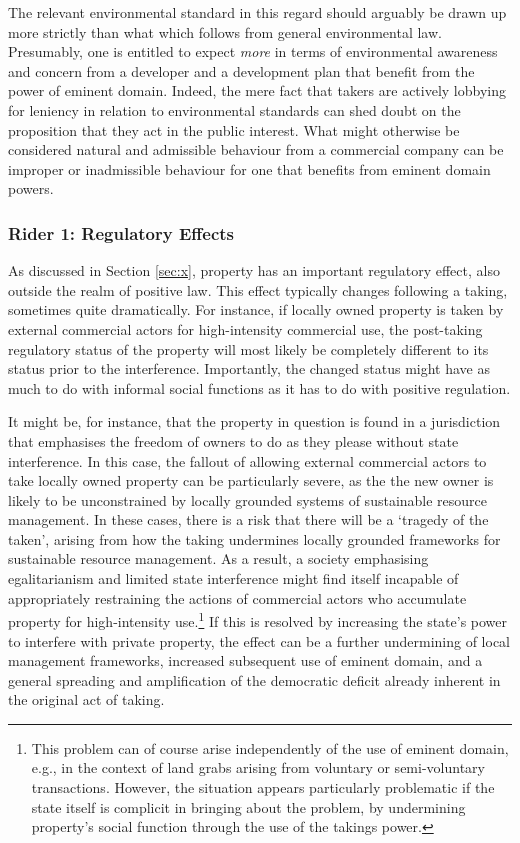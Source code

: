 The relevant environmental standard in this regard should arguably be drawn up more strictly than what which follows from general environmental law. Presumably, one is entitled to expect {\it more} in terms of environmental awareness and concern from a developer and a development plan that benefit from the power of eminent domain. Indeed, the mere fact that takers are actively lobbying for leniency in relation to environmental standards can shed doubt on the proposition that they act in the public interest. What might otherwise be considered natural and admissible behaviour from a commercial company can be improper or inadmissible behaviour for one that benefits from eminent domain powers.

\subsubsection*{Rider 1: Regulatory Effects}

As discussed in Section \ref{sec:x}, property has an important regulatory effect, also outside the realm of positive law. This effect typically changes following a taking, sometimes quite dramatically.  For instance, if locally owned property is taken by external commercial actors for high-intensity commercial use, the post-taking regulatory status of the property will most likely be completely different to its status prior to the interference. Importantly, the changed status might have as much to do with informal social functions as it has to do with positive regulation.

It might be, for instance, that the property in question is found in a jurisdiction that emphasises  the freedom of owners to do as they please without state interference. In this case, the fallout of allowing external commercial actors to take locally owned property can be particularly severe, as the the new owner is likely to be unconstrained by locally grounded systems of sustainable resource management. In these cases, there is a risk that there will be a `tragedy of the taken', arising from how the taking undermines locally grounded frameworks for sustainable resource management. As a result, a society emphasising egalitarianism and limited state interference might find itself incapable of appropriately restraining the actions of commercial actors who accumulate property for high-intensity use.\footnote{This problem can of course arise independently of the use of eminent domain, e.g., in the context of land grabs arising from voluntary or semi-voluntary transactions. However, the situation appears particularly problematic if the state itself is complicit in bringing about the problem, by undermining property's social function through the use of the takings power.} If this is resolved by increasing the state's power to interfere with private property, the effect can be a further undermining of local management frameworks, increased subsequent use of eminent domain, and a general spreading and amplification of the democratic deficit already inherent in the original act of taking.


